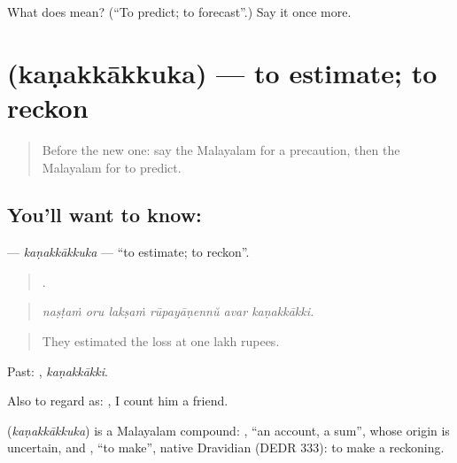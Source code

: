 \begin{tcolorbox}[breakable,colback=teal!4,colframe=teal!35!black,title={Before you move on}]
What does  mean? (\textquotedblleft{}To predict; to forecast\textquotedblright{}.) Say it once more.
\end{tcolorbox}
\section[\texorpdfstring{\ml{കണക്കാക്കുക} (kaṇakkākkuka)}{കണക്കാക്കുക (kaṇakkākkuka)}]{ (kaṇakkākkuka) — to estimate; to reckon}

\label{lesson:ML-C442-kanakkakkuka}



\begin{quote}
Before the new one: say the Malayalam for a precaution, then the Malayalam for to predict.
\end{quote}

\subsection*{You'll want to know: }
\textbf{} — \emph{kaṇakkākkuka} — \textquotedblleft{}to estimate; to reckon\textquotedblright{}.

\begin{quote}
     .
\end{quote}

\begin{quote}
\emph{naṣṭaṁ oru lakṣaṁ rūpayāṇennŭ avar kaṇakkākki.}
\end{quote}

\begin{quote}
They estimated the loss at one lakh rupees.
\end{quote}

Past: , \emph{kaṇakkākki}.

Also to regard as:    , I count him a friend.

\begin{cousinweb}
\textbf{} (\emph{kaṇakkākkuka}) is a Malayalam compound: , \textquotedblleft{}an account, a sum\textquotedblright{}, whose origin is uncertain, and , \textquotedblleft{}to make\textquotedblright{}, native Dravidian (DEDR 333): to make a reckoning.
\end{cousinweb}

